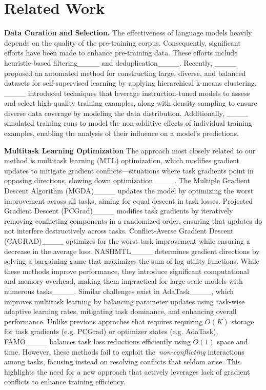 \section{Related Work}
\label{sec: related}

\textbf{\small Data Curation and Selection.} The effectiveness of language models heavily depends on the quality of the pre-training corpus. Consequently, significant efforts have been made to enhance pre-training data. These efforts include heuristic-based filtering____ and deduplication____. Recently, ____ proposed an automated method for constructing large, diverse, and balanced datasets for self-supervised learning by applying hierarchical k-means clustering. ____ introduced techniques that leverage instruction-tuned models to assess and select high-quality training examples, along with density sampling to ensure diverse data coverage by modeling the data distribution. Additionally, ____ simulated training runs to model the non-additive effects of individual training examples, enabling the analysis of their influence on a model's predictions.

\textbf{\small Multitask Learning Optimization}  
The approach most closely related to our method is multitask learning (MTL) optimization, which modifies gradient updates to mitigate gradient conflicts—situations where task gradients point in opposing directions, slowing down optimization____. The Multiple Gradient Descent Algorithm (MGDA)____ updates the model by optimizing the worst improvement across all tasks, aiming for equal descent in task losses. Projected Gradient Descent (PCGrad)____ modifies task gradients by iteratively removing conflicting components in a randomized order, ensuring that updates do not interfere destructively across tasks. Conflict-Averse Gradient Descent (CAGRAD)____ optimizes for the worst task improvement while ensuring a decrease in the average loss. NASHMTL____ determines gradient directions by solving a bargaining game that maximizes the sum of log utility functions. While these methods improve performance, they introduce significant computational and memory overhead, making them impractical for large-scale models with numerous tasks____. Similar challenges exist in AdaTask____, which improves multitask learning by balancing parameter updates using task-wise adaptive learning rates, mitigating task dominance, and enhancing overall performance. Unlike previous approches that requires  requiring \(O(K)\) storage for task gradients (e.g. PCGrad) or optimizer states (e.g. AdaTask), FAMO____ balances task loss reductions efficiently using \(O(1)\) space and time. However, these methods fail to exploit the~\textit{non-conflicting} interactions among tasks, focusing instead on resolving conflicts that seldom arise. This highlights the need for a new approach that actively leverages lack of gradient conflicts to enhance training efficiency. 


